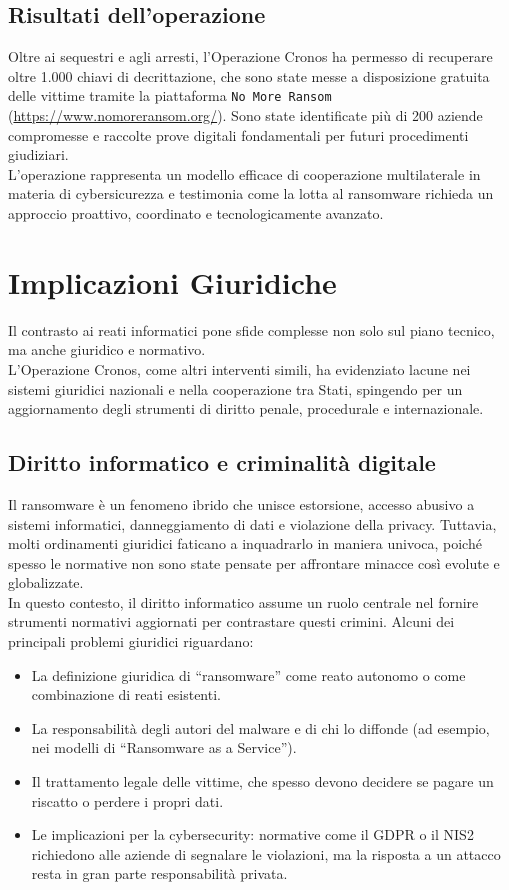 \documentclass[a4paper,12pt]{article}
\begin{document}
\subsection{Risultati dell'operazione}
Oltre ai sequestri e agli arresti, l’Operazione Cronos ha permesso di recuperare oltre 1.000 chiavi di decrittazione, che sono state messe a disposizione gratuita delle vittime tramite la piattaforma \texttt{No More Ransom} (\url{https://www.nomoreransom.org/}). Sono state identificate più di 200 aziende compromesse e raccolte prove digitali fondamentali per futuri procedimenti giudiziari.\\
L’operazione rappresenta un modello efficace di cooperazione multilaterale in materia di cybersicurezza e testimonia come la lotta al ransomware richieda un approccio proattivo, coordinato e tecnologicamente avanzato.

\section{Implicazioni Giuridiche}
Il contrasto ai reati informatici pone sfide complesse non solo sul piano tecnico, ma anche giuridico e normativo.\\
L'Operazione Cronos, come altri interventi simili, ha evidenziato lacune nei sistemi giuridici nazionali e nella cooperazione tra Stati, spingendo per un aggiornamento degli strumenti di diritto penale, procedurale e internazionale.

\subsection{Diritto informatico e criminalità digitale}
Il ransomware è un fenomeno ibrido che unisce estorsione, accesso abusivo a sistemi informatici, danneggiamento di dati e violazione della privacy. Tuttavia, molti ordinamenti giuridici faticano a inquadrarlo in maniera univoca, poiché spesso le normative non sono state pensate per affrontare minacce così evolute e globalizzate.\\
In questo contesto, il diritto informatico assume un ruolo centrale nel fornire strumenti normativi aggiornati per contrastare questi crimini. Alcuni dei principali problemi giuridici riguardano:

\begin{itemize}
    \item La definizione giuridica di ``ransomware'' come reato autonomo o come combinazione di reati esistenti.
    \item La responsabilità degli autori del malware e di chi lo diffonde (ad esempio, nei modelli di ``Ransomware as a Service'').
    \item Il trattamento legale delle vittime, che spesso devono decidere se pagare un riscatto o perdere i propri dati.
    \item Le implicazioni per la cybersecurity: normative come il GDPR o il NIS2 richiedono alle aziende di segnalare le violazioni, ma la risposta a un attacco resta in gran parte responsabilità privata.
\end{itemize}
\end{document}
